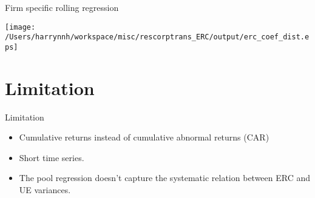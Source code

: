 \documentclass[bigger,allowframebreaks]{beamer}
\begin{document}
\begin{frame}[label={sec:org7963920}]{Firm specific rolling regression}
\begin{center}
\texttt{[image: /Users/harrynnh/workspace/misc/rescorptrans\_ERC/output/erc\_coef\_dist.eps]}
\end{center}
\end{frame}
\section{Limitation}
\label{sec:orge3e8ad5}
\begin{frame}[label={sec:org410d8ec}]{Limitation}
\begin{itemize}
\item Cumulative returns instead of cumulative abnormal returns (CAR)
\item Short time series.
\item The pool regression doesn't capture the systematic relation between ERC and UE variances.
\end{itemize}
\end{frame}
\end{document}
